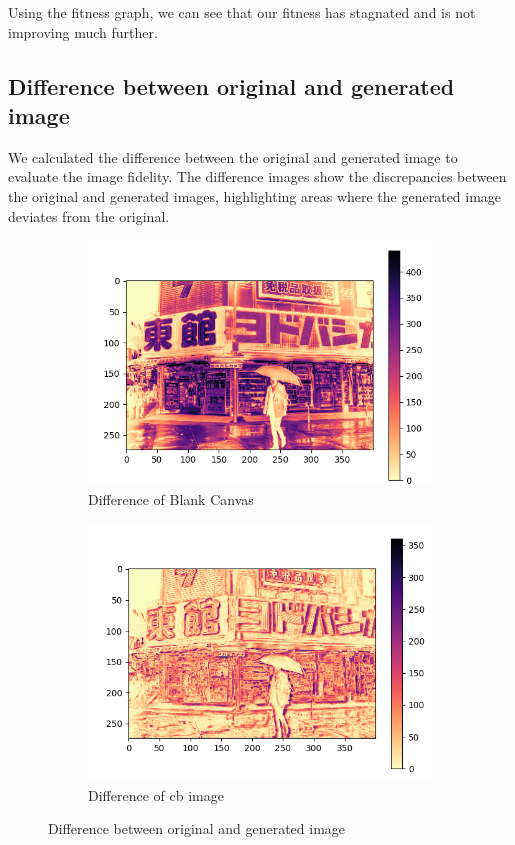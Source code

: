 \documentclass[10pt, conference]{IEEEtran}
\begin{document}
Using the fitness graph, we can see that our fitness has stagnated and is not improving much further.

\subsection*{
	Difference between original and generated image
}
We calculated the difference between the original and generated image to evaluate the image fidelity. The difference images show the discrepancies between the original and generated images, highlighting areas where the generated image deviates from the original.

\begin{figure}[h!]
	\centering
	\begin{subfigure}{0.4\linewidth}
		\centering
		\includegraphics[width=\linewidth]{Screenshot 2025-01-02 172336.png}
		\caption{Difference of Blank Canvas}
	\end{subfigure}
	\begin{subfigure}{0.4\linewidth}
		\centering
		\includegraphics[width=\linewidth]{Screenshot 2025-01-02 172237.png}
		\caption{Difference of cb image}
	\end{subfigure}
	\caption{Difference between original and generated image}
\end{figure}
\end{document}
